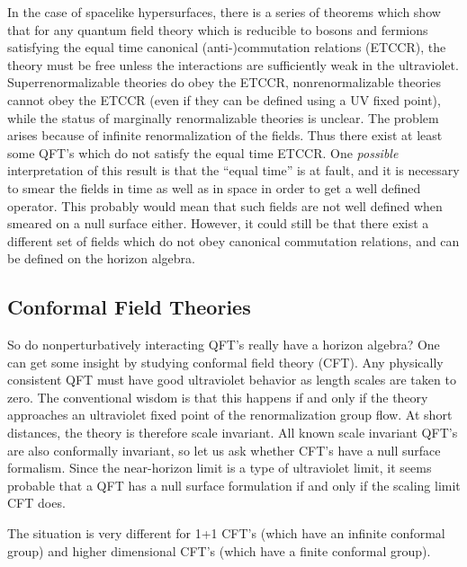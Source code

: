 \documentclass{article}
\begin{document}
In the case of spacelike hypersurfaces, there is a series of theorems \cite{powers67} which show that for any quantum field theory which is reducible to bosons and fermions satisfying the equal time canonical (anti-)commutation relations (ETCCR), the theory must be free unless the interactions are sufficiently weak in the ultraviolet.  Superrenormalizable theories do obey the ETCCR, nonrenormalizable theories cannot obey the ETCCR (even if they can be defined using a UV fixed point), while the status of marginally renormalizable theories is unclear.  The problem arises because of infinite renormalization of the fields.  Thus there exist at least some QFT's which do not satisfy the equal time ETCCR.  One \emph{possible} interpretation of this result is that the ``equal time'' is at fault, and it is necessary to smear the fields in time as well as in space in order to get a well defined operator.  This probably would mean that such fields are not well defined when smeared on a null surface either.  However, it could still be that there exist a different set of fields which do not obey canonical commutation relations, and can be defined on the horizon algebra.

\subsection{Conformal Field Theories}\label{nonpert}

So do nonperturbatively interacting QFT's really have a horizon algebra?  One can get some insight by studying conformal field theory (CFT).  Any physically consistent QFT must have good ultraviolet behavior as length scales are taken to zero.  The conventional wisdom is that this happens if and only if the theory approaches an ultraviolet fixed point of the renormalization group flow.  At short distances, the theory is therefore scale invariant.  All known scale invariant QFT's are also conformally invariant, so let us ask whether CFT's have a null surface formalism.  Since the near-horizon limit is a type of ultraviolet limit, it seems probable that a QFT has a null surface formulation if and only if the scaling limit CFT does.

The situation is very different for 1+1 CFT's (which have an infinite conformal group) and higher dimensional CFT's (which have a finite conformal group).
\end{document}
